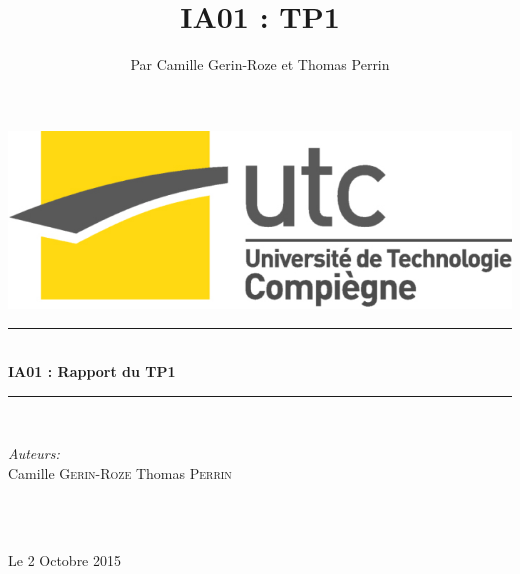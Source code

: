 \documentclass[a4paper,10pt]{report}
\title{IA01 : TP1}
\author{Par Camille Gerin-Roze et Thomas Perrin}
\begin{document}
\begin{titlepage}

\begin{flushright}
  \includegraphics[scale = 0.2]{logo_utc.jpg}
\end{flushright}
\vspace*{5cm}

\newcommand{\HRule}{\rule{\linewidth}{0.5mm}} %
\center %
 



\HRule \\[0.4cm]
{ \LARGE \bfseries  IA01 : Rapport du TP1}\\[0.4cm] %
\HRule \\[1.5cm]
 
\begin{minipage}{0.4\textwidth}
\begin{flushleft} \large
\emph{Auteurs:}\\
Camille \textsc{Gerin-Roze} \newline
Thomas \textsc{Perrin} 
\end{flushleft}
\end{minipage}
~
\begin{minipage}{0.4\textwidth}

\end{minipage}\\[1.3cm]


{\large Le 2 Octobre 2015} %

\end{titlepage}
\tableofcontents
\end{document}
